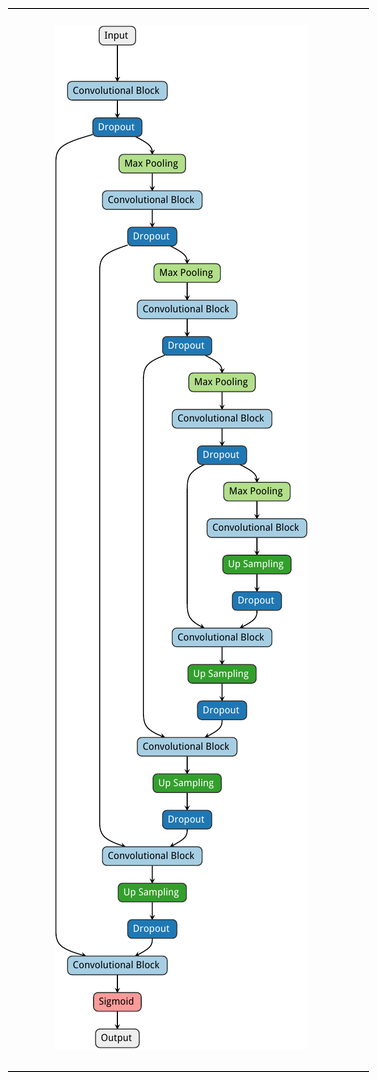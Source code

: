 \begin{figure}

	\centering

	\begin{tabularx}{\textwidth}{cX}
		\begin{subfigure}[b]{0.40\textwidth}
			\centering
			\includegraphics[height=0.91\textheight]{figures/unet_arch.pdf}

\end{subfigure}
\end{tabularx}
\end{figure}
